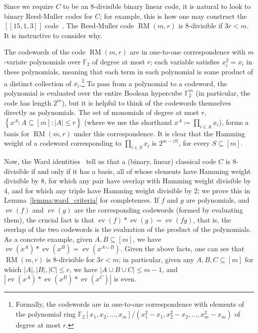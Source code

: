 \documentclass{article}
\DeclareMathOperator{\ev}{ev}
\DeclareMathOperator{\RM}{RM}
\begin{document}
Since we require $C$ to be an $8$-divisible binary linear code, it is natural to look to binary Reed-Muller codes for $C$; for example, this is how one may construct the $[[15,1,3]]$ code~\cite{knill1996threshold,steane1999quantum,MSD}. The Reed-Muller code $\RM(m,r)$ is $8$-divisible if $3r < m$. It is instructive to consider why.

The codewords of the code $\RM(m,r)$ are in one-to-one correspondence with $m$-variate polynomials over $\mathbb{F}_2$ of degree at most $r$; each variable satisfies $x_i^2 = x_i$ in these polynomials, meaning that each term in each polynomial is some product of a distinct collection of $x_i$.\footnote{Formally, the codewords are in one-to-one correspondence with elements of the polynomial ring $\mathbb{F}_2[x_1, x_2, \ldots, x_m]/(x_1^2-x_1, x_2^2-x_2, \ldots, x_m^2-x_m)$ of degree at most $r$.} To pass from a polynomial to a codeword, the polynomial is evaluated over the entire Boolean hypercube $\mathbb{F}_2^m$ (in particular, the code has length $2^m$), but it is helpful to think of the codewords themselves directly as polynomials. The set of monomials of degree at most $r$, $\left\{x^A: A \subseteq [m]: |A| \leq r\right\}$ (where we use the shorthand $x^A \coloneq \prod_{i \in A}x_i$), forms a basis for $\RM(m,r)$ under this correspondence. It is clear that the Hamming weight of a codeword corresponding to $\prod_{i \in S}x_i$ is $2^{m-|S|}$, for every $S \subseteq [m]$.

Now, the Ward identities~\cite{ward1990weight} tell us that a (binary, linear) classical code $C$ is $8$-divisible if and only if it has a basis, all of whose elements have Hamming weight divisible by $8$, for which any pair have overlap with Hamming weight divisible by $4$, and for which any triple have Hamming weight divisible by $2$; we prove this in Lemma~\ref{lemma:ward_criteria} for completeness. If $f$ and $g$ are polynomials, and $\ev(f)$ and $\ev(g)$ are the corresponding codewords (formed by evaluating them), the crucial fact is that $\ev(f)*\ev(g) = \ev(fg)$, that is, the overlap of the two codewords is the evaluation of the product of the polynomials. As a concrete example, given $A, B \subseteq [m]$, we have $\ev(x^A)*\ev(x^B) = \ev(x^{A \cup B})$. Given the above facts, one can see that $\RM(m,r)$ is $8$-divisible for $3r < m$; in particular, given any $A,B,C \subseteq [m]$ for which $|A|, |B|, |C| \leq r$, we have $|A \cup B \cup C| \leq m-1$, and $|\ev(x^A)*\ev(x^B)*\ev(x^C)|$ is even.
\end{document}
